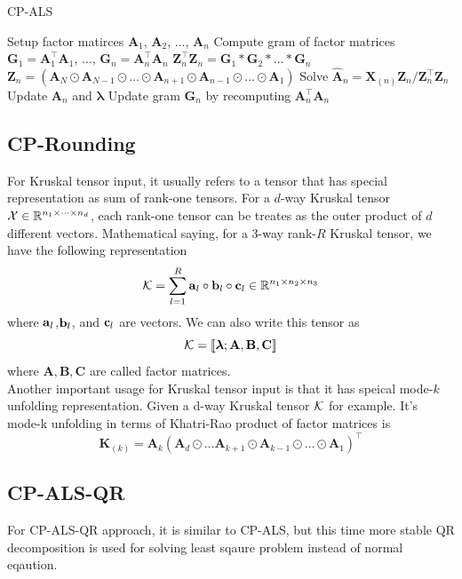 \documentclass{article}
\newcommand{\mat}[1]{\mathbf{#1}}
\newcommand{\M}[2][]{\bm{#1{\mathbf{\MakeUppercase{#2}}}}} 		%
\newcommand{\V}[2][]{\bm{#1{\mathbf{\MakeLowercase{#2}}}}} 		%
\newcommand{\T}[2][]{#1{\mathbf{\cal{#2}}}} 						%
\begin{document}
\begin{algorithm}[!ht]
  \caption{CP-ALS}
  \label{alg:cp-als}
  \begin{algorithmic}[1]\footnotesize
    
    \Function{$[\bm{\lambda},\M{A}_{n}]=$ CP-ALS}{$\T{X},R$}
      \State Setup factor matirces  $\mat{A}_1$, $\mat{A}_2$, $\dots$, $\mat{A}_n$
      \State Compute gram of factor matrices $\mat{G}_1 = \mat{A}_1^\top \mat{A}_1$, $\dots$, $\mat{G}_n = \mat{A}_n^\top \mat{A}_n$  
      \State $\mat{Z}_n^\top\mat{Z}_n = \mat{G}_1 \ast \mat{G}_2 \ast \dots \ast \mat{G}_n$
      \State $\mat{Z}_n =  (\mat{A}_N \odot \mat{A}_{N-1} \odot \dots \odot \mat{A}_{n+1} \odot \mat{A}_{n-1} \odot \dots \odot \mat{A}_1)$
      \State Solve $\mat{\hat{A}}_n = \mat{X}_{(n)}\mat{Z}_n / \mat{Z}_n^\top\mat{Z}_n$
      \State Update $\mat{A}_n$ and $\bm{\lambda}$
      \State Update gram $\mat{G}_n$ by recomputing $\mat{A}_n^\top\mat{A}_n$
      
      \EndFor
      \EndWhile
    \EndFunction
    
  \end{algorithmic}
\end{algorithm}

\subsection{CP-Rounding}
For Kruskal tensor input, it usually refers to a tensor that has special representation as sum of rank-one 
tensors. For a $d$-way Kruskal tensor $\T{X} \in \mathbb{R}^{n_1 \times \dots \times n_d}$, each rank-one 
tensor can be treates as the outer product of $d$ different vectors. Mathematical saying, for a 3-way rank-$R$ Kruskal tensor,
we have the following representation
$$\T{K} = \sum^{R}_{l=1}\V{a}_l \circ\V{b}_l \circ\V{c}_l \in \mathbb{R}^{n_1 \times n_2 \times n_3}$$
where $\V{a}_l$,$\V{b}_l$, and $ \V{c}_l$ are vectors. We can also write this tensor as
$$\T{K} = [\![\bm{\lambda} ; \mat{A},\mat{B},\mat{C}]\!]$$
where $\mat{A},\mat{B},\mat{C}$ are called factor matrices.
\\
Another important usage for Kruskal tensor input is that it has speical mode-$k$ unfolding representation. Given a d-way Kruskal tensor $\T{K}$ for example. It's mode-k unfolding 
in terms of Khatri-Rao product of factor matrices is
$$\mat{K}_{(k)} = \mat{A}_k(\mat{A}_d \odot \dots \mat{A}_{k+1} \odot \mat{A}_{k-1} \odot \dots \odot \mat{A}_1)^\top$$
\subsection{CP-ALS-QR}
For CP-ALS-QR approach, it is similar to CP-ALS, but this time more stable QR decomposition is used for solving least sqaure
problem instead of normal eqaution.
\end{document}
